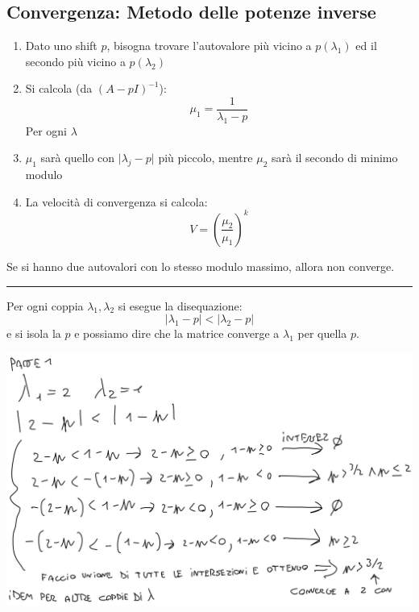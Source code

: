 \documentclass[10pt]{article}
\begin{document}
\subsection{Convergenza: Metodo delle potenze inverse}
\begin{enumerate}
    \item Dato uno shift $p$, bisogna trovare l'autovalore più vicino a $p(\lambda_{1})$ ed il secondo più vicino a $p(\lambda_{2})$
    \item Si calcola (da $(A-pI)^{-1}$): \begin{equation*}
        \mu_{1} = \frac{1}{\lambda_{1}-p}
    \end{equation*}
    Per ogni $\lambda$
    \item $\mu_{1}$ sarà quello con $\lvert\lambda_{j}-p\rvert$ più piccolo, mentre $\mu_{2}$ sarà il secondo di minimo modulo
    \item La velocità di convergenza si calcola: \begin{equation*}
        V = \left(\frac{\mu_{2}}{\mu_{1}}\right)^{k}
    \end{equation*}
\end{enumerate}
Se si hanno due autovalori con lo stesso modulo massimo, allora non converge.
\vspace{5pt}
\hrule
\vspace{5pt}
Per ogni coppia $\lambda_{1},\lambda_{2}$ si esegue la disequazione: \begin{equation*}
    \lvert \lambda_{1}-p \rvert < \lvert \lambda_{2}-p \rvert
\end{equation*}
e si isola la $p$ e possiamo dire che la matrice converge a $\lambda_{1}$ per quella $p$.
\begin{center}
    \includegraphics[scale=0.2]{potenzainversa.png}
\end{center}
\end{document}

